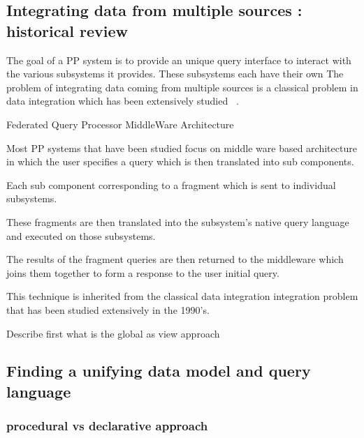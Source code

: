
\subsection{Integrating data from multiple sources : historical review}

The goal of a PP system is to provide an unique query interface to interact with the various subsystems it provides. These subsystems each have their own The problem of integrating data coming from multiple sources is a classical problem in data integration which has been extensively studied ~\cite{Lenzerini2002}. 

Federated Query Processor MiddleWare Architecture

Most PP systems that have been studied focus on middle ware based architecture in which the user specifies a query which is then translated into sub components.

Each sub component corresponding to a fragment which is sent to individual subsystems.

These fragments are then translated into the subsystem's native query language and executed on those subsystems.

The results of the fragment queries are then returned to the middleware which joins them together to form a response to the user initial query.

This technique is inherited from the classical data integration integration problem that has been studied extensively in the 1990's.

Describe first what is the global as view approach 

\subsection{Finding a unifying data model and query language}

\subsubsection{procedural vs declarative approach}

